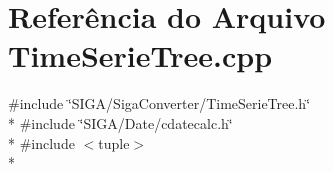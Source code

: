 \section{Referência do Arquivo Time\+Serie\+Tree.\+cpp}
\label{_time_serie_tree_8cpp}
{\ttfamily \#include \char`\"{}S\+I\+G\+A/\+Siga\+Converter/\+Time\+Serie\+Tree.\+h\char`\"{}}\\*
{\ttfamily \#include \char`\"{}S\+I\+G\+A/\+Date/cdatecalc.\+h\char`\"{}}\\*
{\ttfamily \#include $<$tuple$>$}\\*
